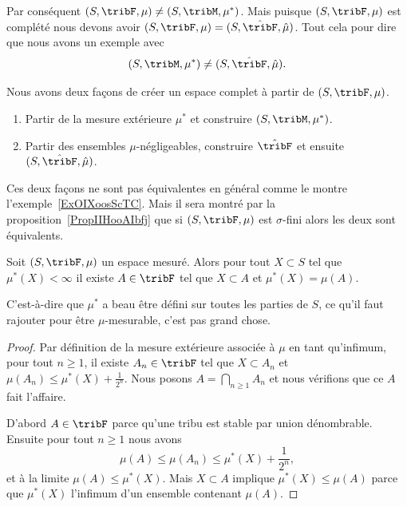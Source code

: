 \begin{example}
	Par conséquent \( (S,\tribF,\mu) \neq (S,\tribM,\mu^*)\). Mais puisque \( (S,\tribF,\mu)\) est complété nous devons avoir \( (S,\tribF,\mu)=(S,\hat\tribF,\hat\mu)\). Tout cela pour dire que nous avons un exemple avec
	\begin{equation}
		(S,\tribM,\mu^*)\neq (S,\hat\tribF,\hat \mu).
	\end{equation}
\end{example}

Nous avons deux façons de créer un espace complet à partir de \( (S,\tribF,\mu)\).
\begin{enumerate}
	\item
	      Partir de la mesure extérieure \( \mu^*\) et construire \( (S,\tribM,\mu^*)\).
	\item
	      Partir des ensembles \( \mu\)-négligeables, construire \( \hat\tribF\) et ensuite \( (S,\hat\tribF,\hat\mu)\).
\end{enumerate}
Ces deux façons ne sont pas équivalentes en général comme le montre l'exemple~\ref{ExOIXoosScTC}. Mais il sera montré par la proposition~\ref{PropIIHooAIbfj} que si \( (S,\tribF,\mu)\) est \( \sigma\)-fini alors les deux sont équivalents.

\begin{lemma}   \label{LemAESoofkMpi}
	Soit \( (S,\tribF,\mu)\) un espace mesuré. Alors pour tout \( X\subset S\) tel que \( \mu^*(X)<\infty\) il existe \( A\in\tribF\) tel que \( X\subset A\) et \( \mu^*(X)=\mu(A)\).
\end{lemma}
C'est-à-dire que \( \mu^*\) a beau être défini sur toutes les parties de \( S\), ce qu'il faut rajouter pour être \( \mu\)-mesurable, c'est pas grand chose.

\begin{proof}
	Par définition de la mesure extérieure associée à \( \mu\) en tant qu'infimum, pour tout \( n\geq 1\), il existe \( A_n\in\tribF\) tel que \( X\subset A_n\) et \( \mu(A_n)\leq \mu^*(X)+\frac{1}{ 2^n }\). Nous posons \( A=\bigcap_{n\geq 1}A_n\) et nous vérifions que ce \( A\) fait l'affaire.

	D'abord \( A\in\tribF\) parce qu'une tribu est stable par union dénombrable. Ensuite pour tout \( n\geq 1\) nous avons
	\begin{equation}
		\mu(A)\leq \mu(A_n)\leq \mu^*(X)+\frac{1}{ 2^n },
	\end{equation}
	et à la limite \( \mu(A)\leq \mu^*(X)\). Mais \( X\subset A\) implique \( \mu^*(X)\leq \mu(A)\) parce que \( \mu^*(X)\) l'infimum d'un ensemble contenant \( \mu(A)\).
\end{proof}

